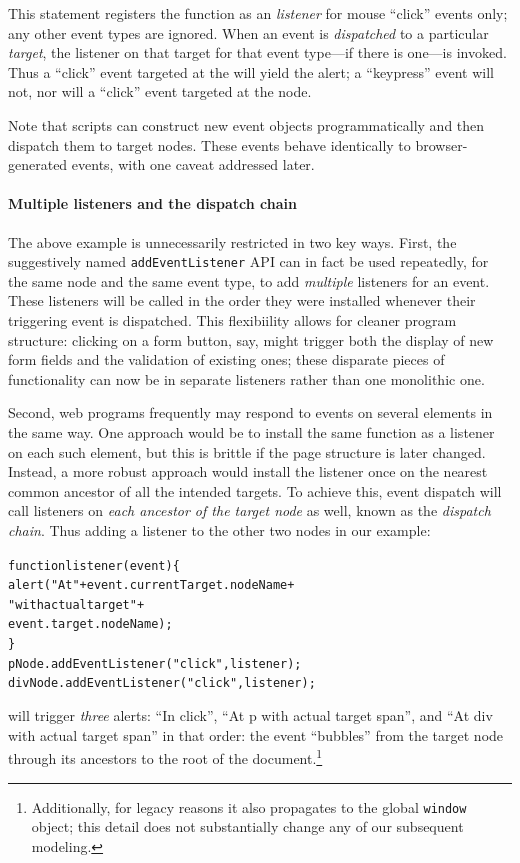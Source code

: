 \documentclass[letterpaper,10pt,twocolumn]{article}
\newcommand{\quot}{\mbox{\tt\char'042}}
\newcommand{\wild}{\mbox{\tt\char'137}}
\newcommand{\impl}[1]{{\def\_{\wild}\def\"{\quot}\tt#1}}
\begin{document}
This statement registers the function as an \emph{listener} for mouse
``click'' events only; any other event types are ignored.  When an
event is \emph{dispatched} to a particular \emph{target}, the
listener on that target for that event type---if there is one---is
invoked.  Thus a ``click'' event targeted at the  will
yield the alert; a ``keypress'' event will not, nor will a ``click''
event targeted at the  node.

Note that scripts can construct new event objects programmatically and
then dispatch them to target nodes.  These events behave identically
to browser-generated events, with one caveat addressed later.
\paragraph{Multiple listeners and the dispatch chain}
The above example is unnecessarily restricted in two key ways.  First,
the suggestively named \impl{addEventListener} API can in fact be used
repeatedly, for the same node and the same event type, to add
\emph{multiple} listeners for an event.  These listeners will be
called in the order they were installed whenever their triggering
event is dispatched.  This flexibiility allows for cleaner program
structure: clicking on a form button, say, might trigger both the
display of new form fields and the validation of existing ones; these
disparate pieces of functionality can now be in separate listeners
rather than one monolithic one.

Second, web programs frequently may respond to events on several
elements in the same way.  One approach would be to install the same
function as a listener on each such element, but this is brittle if
the page structure is later changed.  Instead, a more robust approach
would install the listener once on the nearest common ancestor of all
the intended targets.  To achieve this, event dispatch will call
listeners on \emph{each ancestor of the target node} as well, known as
the \emph{dispatch chain}.  Thus adding a listener to the other two
nodes in our example:
\begin{alltt}
  function listener(event) \{
    alert("At " + event.currentTarget.nodeName +
          " with actual target " + 
          event.target.nodeName);
  \}
  pNode.addEventListener("click", listener);
  divNode.addEventListener("click", listener);
\end{alltt}
will trigger \emph{three} alerts: ``In click'', ``At p with actual
target span'', and ``At div with actual target span'' in that order:
the event ``bubbles'' from the target node through its
ancestors to the root of the document.\footnote{Additionally, for
  legacy reasons it also propagates to the global \impl{window}
  object; this detail does not substantially change any of our
  subsequent modeling.}
\end{document}
